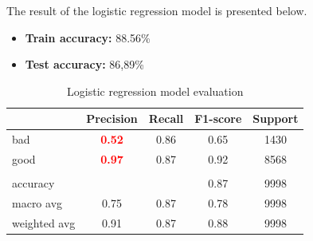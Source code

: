 The result of the logistic regression model is presented below.
\begin{itemize}
	\item \textbf{Train accuracy:} 88.56\%
	\item \textbf{Test accuracy:} 86,89\%
\end{itemize}


\begin{table}[h!]
	\centering
	\begin{tabular}{l|cccc}
	\hline
				 & \multicolumn{1}{l}{\textbf{Precision}} & \multicolumn{1}{l}{\textbf{Recall}} & \multicolumn{1}{l}{\textbf{F1-score}} & \multicolumn{1}{l}{\textbf{Support}} \\ \hline
	bad          & \textcolor{red}{\textbf{0.52}}                          & 0.86                                & 0.65                                  & 1430                                 \\
	good         & \textcolor{red}{\textbf{0.97}}                          & 0.87                                & 0.92                                  & 8568                                 \\
				 &                                        &                                     &                                       &                                      \\
	accuracy     &                                        &                                     & 0.87                                  & 9998                                 \\
	macro avg    & 0.75                                   & 0.87                                & 0.78                                  & 9998                                 \\
	weighted avg & 0.91                                   & 0.87                                & 0.88                                  & 9998  \\ \hline                              
	\end{tabular}
	\caption{\label{demo-table} Logistic regression model evaluation}
	\end{table}

